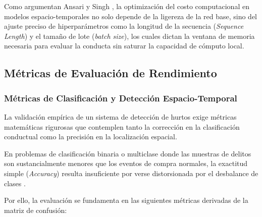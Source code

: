 Como argumentan Ansari y Singh \cite{ansari_optimized_2023}, la optimización del costo computacional en modelos espacio-temporales no solo depende de la ligereza de la red base, sino del ajuste preciso de hiperparámetros como la longitud de la secuencia (\textit{Sequence Length}) y el tamaño de lote (\textit{batch size}), los cuales dictan la ventana de memoria necesaria para evaluar la conducta sin saturar la capacidad de cómputo local.


\subsection{Métricas de Evaluación de Rendimiento}

\subsubsection{Métricas de Clasificación y Detección Espacio-Temporal}

La validación empírica de un sistema de detección de hurtos exige métricas matemáticas rigurosas que contemplen tanto la corrección en la clasificación conductual como la precisión en la localización espacial.

En problemas de clasificación binaria o multiclase donde las muestras de delitos son sustancialmente menores que los eventos de compra normales, la exactitud simple (\textit{Accuracy}) resulta insuficiente por verse distorsionada por el desbalance de clases \cite{rashvand_exploring_2025}.

Por ello, la evaluación se fundamenta en las siguientes métricas derivadas de la matriz de confusión:

